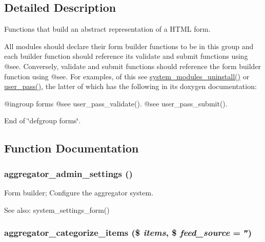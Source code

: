 \subsection{Detailed Description}
Functions that build an abstract representation of a HTML form.

All modules should declare their form builder functions to be in this group and each builder function should reference its validate and submit functions using @see. Conversely, validate and submit functions should reference the form builder function using @see. For examples, of this see \hyperlink{group__forms_g6719870584aaef3fa06f2d0c2392daf1}{system\_\-modules\_\-uninstall()} or \hyperlink{group__forms_gd7f952e136ebcff493ca8de7209100cf}{user\_\-pass()}, the latter of which has the following in its doxygen documentation:

@ingroup forms @see user\_\-pass\_\-validate(). @see user\_\-pass\_\-submit().

End of \char`\"{}defgroup forms\char`\"{}. 

\subsection{Function Documentation}
\hypertarget{group__forms_gfd14b28c0d63cab57fe23fbbb60bc479}{
\subsubsection[{aggregator\_\-admin\_\-settings}]{\setlength{\rightskip}{0pt plus 5cm}aggregator\_\-admin\_\-settings ()}}
\label{group__forms_gfd14b28c0d63cab57fe23fbbb60bc479}


Form builder; Configure the aggregator system.

\begin{Desc}
\item[See also:]system\_\-settings\_\-form() \end{Desc}
\hypertarget{group__forms_gd110881d125af4a6c5c2182a52fe4c69}{
\subsubsection[{aggregator\_\-categorize\_\-items}]{\setlength{\rightskip}{0pt plus 5cm}aggregator\_\-categorize\_\-items (\$ {\em items}, \/  \$ {\em feed\_\-source} = {\tt ''})}}
\label{group__forms_gd110881d125af4a6c5c2182a52fe4c69}


